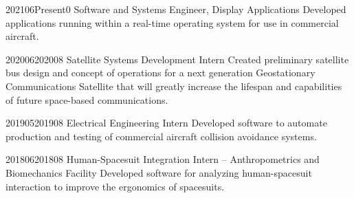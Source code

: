\documentclass[../Gabriel_Roper_Resume]{subfiles}
\begin{document}

{2021}{06}{Present}{0}
{Software and Systems Engineer, Display Applications}
{Developed applications running within a real-time operating
    system for use in commercial aircraft. }

{2020}{06}{2020}{08}
{Satellite Systems Development Intern}
{Created preliminary satellite bus design and concept of operations
    for a next generation Geostationary Communications Satellite that will greatly increase the
    lifespan and capabilities of future space-based communications. }

{2019}{05}{2019}{08}
{Electrical Engineering Intern}
{Developed software to automate production and testing of commercial aircraft
    collision avoidance systems.}

{2018}{06}{2018}{08}
{Human-Spacesuit Integration Intern -- Anthropometrics and Biomechanics Facility}
{Developed software for analyzing human-spacesuit interaction to improve the ergonomics
    of spacesuits.}

\end{document}
